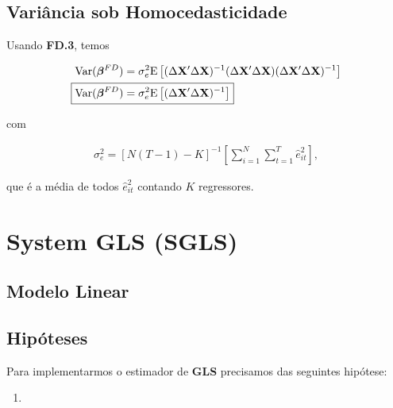 \documentclass[11pt, oneside, a4paper, article]{article}
\numberwithin{equation}{section}
\begin{document}
\begin{description}
\subsection{Variância sob Homocedasticidade}

Usando \textbf{FD.3}, temos

\vspace{-1 em}
\begin{align*} 
\Var( \betavec^{FD} ) &= 
\sigma_{e}^{2}
\E \left[
( \Delta \Xmat' \Delta \Xmat )^{-1}
( \Delta \Xmat' \Delta \Xmat )
( \Delta \Xmat' \Delta \Xmat )^{-1} 
\right]
\\
\Aboxed{
\Var( \betavec^{FD} ) &= 
\sigma^2_{e}
\E \left[
( \Delta \Xmat' \Delta \Xmat )^{-1} 
\right]}
\end{align*}

\noindent 
com

\vspace{-1 em}
\begin{align*} 
\sigma^2_{e} = 
\left[ N ( T - 1 ) - K \right]^{-1}
\left[  
\sum_{i=1}^{N} 
\sum_{t=1}^{T}
\hat{e}_{it}^{2}
\right],
\end{align*}

\noindent
que é a média de todos $\hat{e}^{2}_{it}$ contando $K$ regressores.

\clearpage
\section{System GLS (SGLS)}

\noindent
\citet[Sec.7.4 -- Consistency and Asymptotic Normality of Generalized Least Squares, p.153]{wool-2010} 

\subsection{Modelo Linear}

\subsection{Hipóteses}

Para implementarmos o estimador de \textbf{GLS} precisamos das seguintes hipótese:

\begin{enumerate}
\item %


\end{enumerate}
\end{description}
\end{document}
